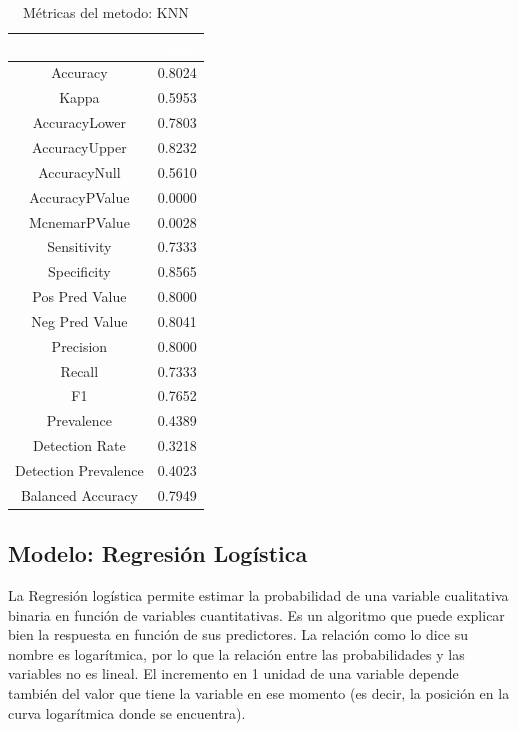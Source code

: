 \begin{table}[!h]
	
	\caption{\label{tab:metricas_KNN}Métricas del metodo: KNN }
	\centering
	\begin{tabular}[t]{cc}
		\toprule
		\rowcolor{black}  \multicolumn{1}{c}{\textcolor{white}{\textbf{metricas}}} & \multicolumn{1}{c}{\textcolor{white}{\textbf{valor}}}\\
		\midrule
		\rowcolor{gray!6}  Accuracy & 0.8024\\
		Kappa & 0.5953\\
		\rowcolor{gray!6}  AccuracyLower & 0.7803\\
		AccuracyUpper & 0.8232\\
		\rowcolor{gray!6}  AccuracyNull & 0.5610\\
		\addlinespace
		AccuracyPValue & 0.0000\\
		\rowcolor{gray!6}  McnemarPValue & 0.0028\\
		Sensitivity & 0.7333\\
		\rowcolor{gray!6}  Specificity & 0.8565\\
		Pos Pred Value & 0.8000\\
		\addlinespace
		\rowcolor{gray!6}  Neg Pred Value & 0.8041\\
		Precision & 0.8000\\
		\rowcolor{gray!6}  Recall & 0.7333\\
		F1 & 0.7652\\
		\rowcolor{gray!6}  Prevalence & 0.4389\\
		\addlinespace
		Detection Rate & 0.3218\\
		\rowcolor{gray!6}  Detection Prevalence & 0.4023\\
		Balanced Accuracy & 0.7949\\
		\bottomrule
	\end{tabular}
\end{table}



\subsection{Modelo: Regresión Logística}

La Regresión logística permite estimar la probabilidad de una variable cualitativa binaria en
función de variables cuantitativas. Es un algoritmo que puede explicar
bien la respuesta en función de sus predictores. La relación como lo
dice su nombre es logarítmica, por lo que la relación entre las
probabilidades y las variables no es lineal. El incremento en 1 unidad de
una variable depende también del valor que tiene la variable en ese
momento (es decir, la posición en la curva logarítmica donde se
encuentra).

